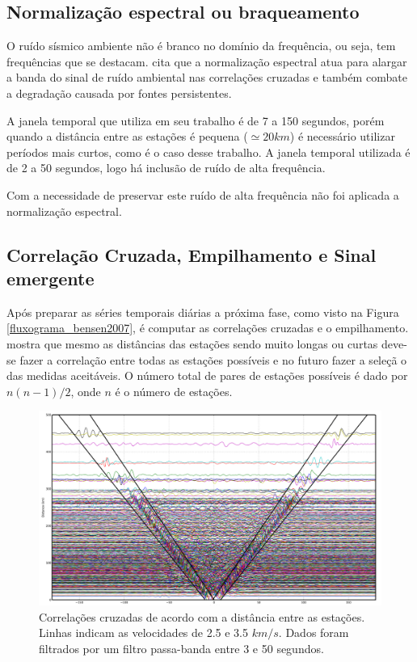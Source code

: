 \subsection{Normalização espectral ou braqueamento}

O ruído sísmico ambiente não é branco no domínio da frequência, ou seja, tem frequências que se destacam. \cite{bensen_processing_2007} cita que a normalização espectral atua para alargar a banda do sinal de ruído ambiental nas correlações cruzadas e também combate a degradação causada por fontes persistentes.

A janela temporal que \cite{bensen_processing_2007} utiliza em seu trabalho é de 7 a 150 segundos, porém quando a distância entre as estações é pequena ($\simeq 20 km$) é necessário utilizar períodos mais curtos, como é o caso desse trabalho. A janela temporal utilizada é de 2 a 50 segundos, logo há inclusão de ruído de alta frequência.

Com a necessidade de preservar este ruído de alta frequência não foi aplicada a normalização espectral.


\subsection{Correlação Cruzada, Empilhamento e  Sinal emergente}

Após preparar as séries temporais diárias a próxima fase, como visto na Figura \ref{fluxograma_bensen2007}, é computar as correlações cruzadas e o empilhamento. \cite{bensen_processing_2007} mostra que mesmo as distâncias das estações sendo muito longas ou curtas deve-se fazer a correlação entre todas as estações possíveis e no futuro fazer a seleçã o das medidas aceitáveis. O número total de pares de estações possíveis é dado por $n(n-1)/2$, onde $n$ é o número de estações.

\begin{figure}[!ht]
\centering
\includegraphics[scale=0.11]{Figs/correlaca_cruzada.png}
\caption[Correlações cruzadas de acordo com a distância entre as estações.]{Correlações cruzadas de acordo com a distância entre as estações. Linhas indicam as velocidades de 2.5 e 3.5 $km/s$. Dados foram filtrados por um filtro passa-banda entre 3 e 50 segundos.}
\label{correlacao_cruzada}
\end{figure} 

